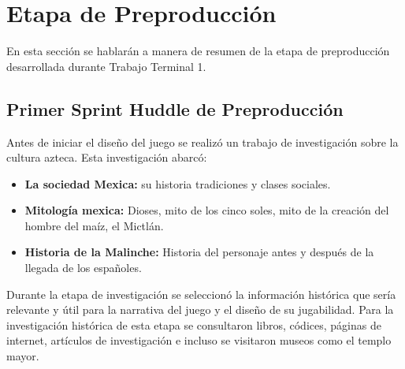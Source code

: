 \section{Etapa de Preproducción}
En esta sección se hablarán a manera de resumen de la etapa de preproducción 
desarrollada durante Trabajo Terminal 1.

\subsection{Primer Sprint Huddle de Preproducción}
Antes de iniciar el diseño del juego se realizó un trabajo de investigación 
sobre la cultura azteca. Esta investigación abarcó:

\begin{itemize}
	\item \textbf{La sociedad Mexica:} su historia tradiciones y clases sociales. 
	\item \textbf{Mitología mexica:} Dioses, mito de los cinco soles, mito de la 
	creación del hombre del maíz, el Mictlán.
	\item \textbf{Historia de la Malinche:} Historia del personaje antes y después 
	de la llegada de los españoles.
\end{itemize} 
 
Durante la etapa de investigación se seleccionó la información histórica que 
sería relevante y útil para la narrativa del juego y el diseño de su jugabilidad. 
Para la investigación histórica de esta etapa se consultaron libros, códices, 
páginas de internet, artículos de investigación e incluso se visitaron museos 
como el templo mayor.

